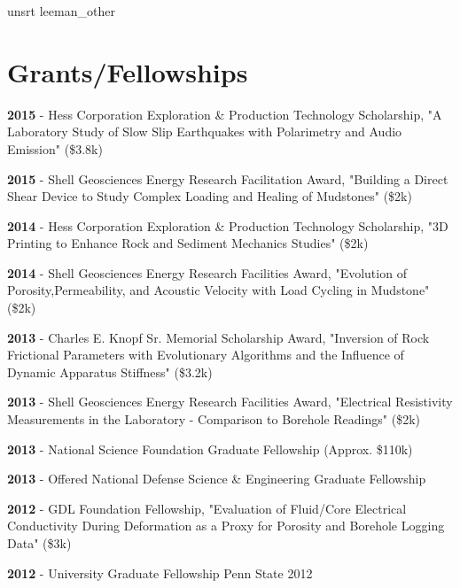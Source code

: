 \documentclass[letterpaper]{article}
\renewenvironment{itemize}{
  \begin{list}{}{
    \setlength{\leftmargin}{1.5em}
  }
}{
  \end{list}
}
\begin{document}
{unsrt}
{leeman_other}{}
\endgroup


\section*{Grants/Fellowships}
\begin{itemize}
\item \textbf{2015} - Hess Corporation Exploration \& Production Technology Scholarship, "A Laboratory Study of Slow Slip Earthquakes with Polarimetry and Audio Emission" (\$3.8k)
\item \textbf{2015} - Shell Geosciences Energy Research Facilitation Award, "Building a Direct Shear Device to Study Complex Loading and Healing of Mudstones" (\$2k)
\item \textbf{2014} - Hess Corporation Exploration \& Production Technology Scholarship, "3D Printing to Enhance Rock and Sediment Mechanics Studies" (\$2k)
\item \textbf{2014} - Shell Geosciences Energy Research Facilities Award, "Evolution of Porosity,Permeability, and Acoustic Velocity with Load Cycling in Mudstone" (\$2k)
\item \textbf{2013} - Charles E. Knopf Sr. Memorial Scholarship Award, "Inversion of Rock Frictional Parameters with Evolutionary Algorithms and the Influence of Dynamic Apparatus Stiffness" (\$3.2k)
\item \textbf{2013} - Shell Geosciences Energy Research Facilities Award, "Electrical Resistivity Measurements in the Laboratory - Comparison to Borehole Readings" (\$2k)
\item \textbf{2013} - National Science Foundation Graduate Fellowship (Approx. \$110k)
\item \textbf{2013} - Offered National Defense Science \& Engineering Graduate Fellowship
\item \textbf{2012} - GDL Foundation Fellowship, "Evaluation of Fluid/Core Electrical Conductivity During Deformation as a Proxy for Porosity and Borehole Logging Data" (\$3k)
\item \textbf{2012} - University Graduate Fellowship Penn State 2012
\end{itemize}
\end{document}
